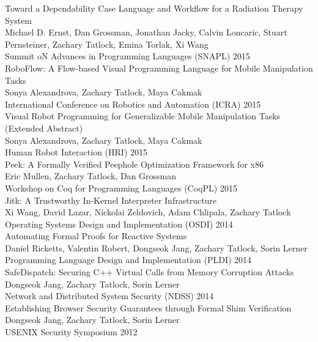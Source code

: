 \documentclass[10pt]{article}
\begin{document}
Toward a Dependability Case Language and Workflow for a Radiation Therapy System \\
Michael D. Ernst, Dan Grossman, Jonathan Jacky, Calvin Loncaric, Stuart Pernsteiner, Zachary Tatlock, Emina Torlak, Xi Wang \\
Summit oN Advances in Programming Languages (SNAPL) 2015 \\

RoboFlow: A Flow-based Visual Programming Language for Mobile Manipulation Tasks \\
Sonya Alexandrova, Zachary Tatlock, Maya Cakmak \\
International Conference on Robotics and Automation (ICRA) 2015 \\

Visual Robot Programming for Generalizable Mobile Manipulation Tasks (Extended Abstract) \\
Sonya Alexandrova, Zachary Tatlock, Maya Cakmak \\
Human Robot Interaction (HRI) 2015 \\

Peek: A Formally Verified Peephole Optimization Framework for x86 \\
Eric Mullen, Zachary Tatlock, Dan Grossman \\
Workshop on Coq for Programming Languages (CoqPL) 2015 \\

Jitk: A Trustworthy In-Kernel Interpreter Infrastructure \\
Xi Wang, David Lazar, Nickolai Zeldovich, Adam Chlipala, Zachary Tatlock \\
Operating Systems Design and Implementation (OSDI) 2014 \\

Automating Formal Proofs for Reactive Systems \\
Daniel Ricketts, Valentin Robert, Dongseok Jang, Zachary Tatlock, Sorin Lerner \\
Programming Language Design and Implementation (PLDI) 2014 \\

SafeDispatch: Securing C++ Virtual Calls from Memory Corruption Attacks \\
Dongseok Jang, Zachary Tatlock, Sorin Lerner \\
Network and Distributed System Security (NDSS) 2014 \\

Establishing Browser Security Guarantees through Formal Shim Verification \\
Dongseok Jang, Zachary Tatlock, Sorin Lerner \\
USENIX Security Symposium 2012 \\
\end{document}
